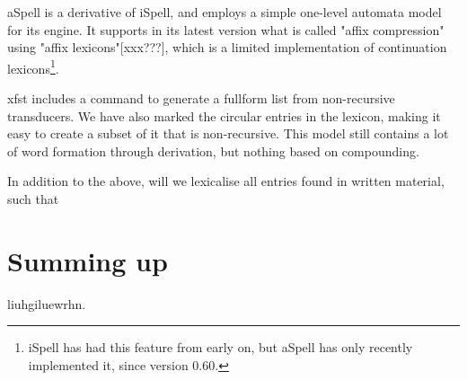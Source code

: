\documentclass[a4paper,english]{article}
\begin{document}
aSpell is a derivative of iSpell, and employs a simple one-level automata model for its engine. It supports in its latest version what is called "affix compression" using "affix lexicons"[xxx???], which is a limited implementation of continuation lexicons\footnote{iSpell has had this feature from early on, but aSpell has only recently implemented it, since version 0.60.}.

xfst includes a command to generate a fullform list from non-recursive transducers. We have also marked the circular entries in the lexicon, making it easy to create a subset of it that is non-recursive. This model still contains a lot of word formation through derivation, but nothing based on compounding.

In addition  to the above, will we lexicalise all entries found in written material, such that

\section{Summing up}

liuhgiluewrhn.

 



\end{document}
